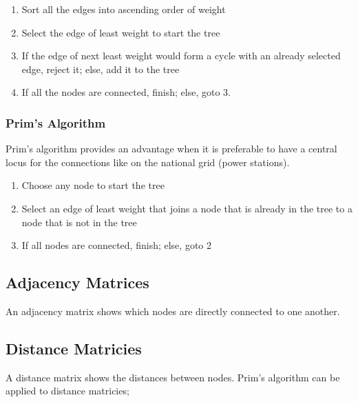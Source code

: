 \documentclass{article}
\begin{document}
\begin{enumerate}
	\item Sort all the edges into ascending order of weight
	\item Select the edge of least weight to start the tree
	\item If the edge of next least weight would form a cycle with an already selected edge, reject it; else, add it to the tree
	\item If all the nodes are connected, finish; else, goto 3.
\end{enumerate}

\subsubsection{Prim's Algorithm}

Prim's algorithm provides an advantage when it is preferable to have a central locus for the connections like on the national grid (power stations).
\begin{enumerate}
	\item Choose any node to start the tree
	\item Select an edge of least weight that joins a node that is already in the tree to a node that is not in the tree
	\item If all nodes are connected, finish; else, goto 2
\end{enumerate}

\subsection{Adjacency Matrices}

An adjacency matrix shows which nodes are directly connected to one another.

\subsection{Distance Matricies}

A distance matrix shows the distances between nodes. Prim's algorithm can be applied to distance matricies;
\end{document}
